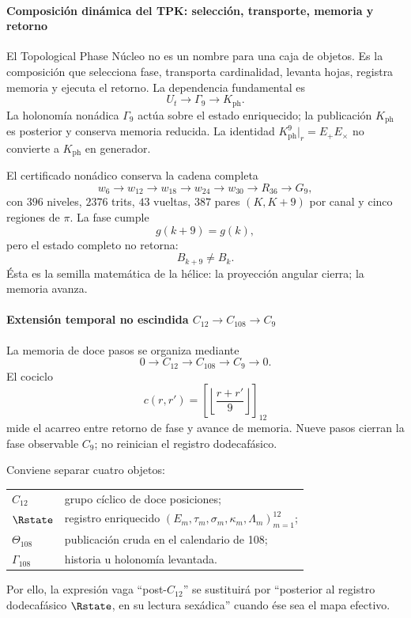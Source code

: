 \paragraph{Composición dinámica del TPK: selección, transporte, memoria y retorno}

El Topological Phase Núcleo no es un nombre para una caja de objetos. Es la
composición que selecciona fase, transporta cardinalidad, levanta hojas,
registra memoria y ejecuta el retorno. La dependencia fundamental es
\[
U_t\longrightarrow\Gamma_9\longrightarrow K_{\mathrm{ph}}.
\]
La holonomía nonádica \(\Gamma_9\) actúa sobre el estado enriquecido; la
publicación \(K_{\mathrm{ph}}\) es posterior y conserva memoria reducida. La
identidad \(K_{\mathrm{ph}}^9|_r=E_+E_\times\) no convierte a \(K_{\mathrm{ph}}\) en
generador.

El certificado nonádico conserva la cadena completa
\[
w_6\to w_{12}\to w_{18}\to w_{24}\to w_{30}
\to R_{36}\to G_9,
\]
con \(396\) niveles, \(2376\) trits, \(43\) vueltas, \(387\) pares
\((K,K+9)\) por canal y cinco regiones de \(\pi\). La fase cumple
\[
g(k+9)=g(k),
\]
pero el estado completo no retorna:
\[
B_{k+9}\ne B_k.
\]
Ésta es la semilla matemática de la hélice: la proyección angular cierra; la
memoria avanza.

\paragraph{Extensión temporal no escindida \(C_{12}\to C_{108}\to C_9\)}

La memoria de doce pasos se organiza mediante
\begin{equation}
0\longrightarrow C_{12}\longrightarrow C_{108}
\longrightarrow C_9\longrightarrow0.
\label{eq:extension-108}
\end{equation}
El cociclo
\[
c(r,r')=\left[\left\lfloor\frac{r+r'}9\right\rfloor\right]_{12}
\]
mide el acarreo entre retorno de fase y avance de memoria. Nueve pasos cierran
la fase observable \(C_9\); no reinician el registro dodecafásico.

Conviene separar cuatro objetos:
\begin{center}
\begin{tabularx}{.95\textwidth}{>{\bfseries}l X}
\toprule
\(C_{12}\) & grupo cíclico de doce posiciones;\\
\(\Rstate\) & registro enriquecido \((E_m,\tau_m,\sigma_m,\kappa_m,\Lambda_m)_{m=1}^{12}\);\\
\(\Theta_{108}\) & publicación cruda en el calendario de 108;\\
\(\Gamma_{108}\) & historia u holonomía levantada.\\
\bottomrule
\end{tabularx}
\end{center}
Por ello, la expresión vaga \enquote{post-\(C_{12}\)} se sustituirá por
\enquote{posterior al registro dodecafásico \(\Rstate\), en su lectura
sexádica} cuando ése sea el mapa efectivo.

